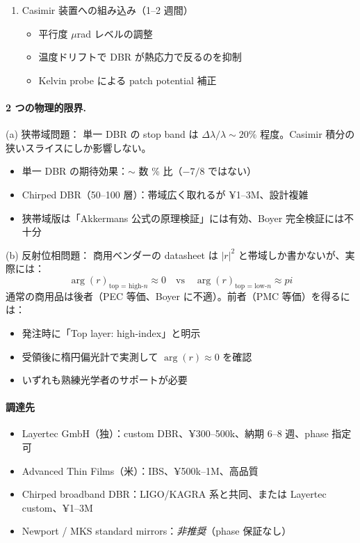\documentclass[11pt,a4paper]{article}
\def\pi{pi}%
\def\textbf#1{#1}%
\begin{document}
\begin{enumerate}
\item \textbf{Casimir 装置への組み込み（1--2 週間）}
  \begin{itemize}
  \item 平行度 $\mu$rad レベルの調整
  \item 温度ドリフトで DBR が熱応力で反るのを抑制
  \item Kelvin probe による patch potential 補正
  \end{itemize}
\end{enumerate}

\paragraph{2 つの物理的限界.}

\textbf{(a) 狭帯域問題}：
単一 DBR の stop band は $\Delta\lambda/\lambda \sim 20\%$ 程度。Casimir 積分の
狭いスライスにしか影響しない。
\begin{itemize}
\item 単一 DBR の期待効果：$\sim$ 数 \% 比（$-7/8$ ではない）
\item Chirped DBR（50--100 層）：帯域広く取れるが ¥1--3M、設計複雑
\item 狭帯域版は「Akkermans 公式の原理検証」には有効、Boyer 完全検証には不十分
\end{itemize}

\textbf{(b) 反射位相問題}：
商用ベンダーの datasheet は $|r|^2$ と帯域しか書かないが、実際には：
\[
  \arg(r)_{\text{top = high-}n} \approx 0 \quad \text{vs} \quad
  \arg(r)_{\text{top = low-}n} \approx \pi
\]
\textbf{通常の商用品は後者（PEC 等価、Boyer に不適）}。前者（PMC 等価）を得るには：
\begin{itemize}
\item 発注時に「Top layer: high-index」と明示
\item 受領後に楕円偏光計で実測して $\arg(r) \approx 0$ を確認
\item いずれも熟練光学者のサポートが必要
\end{itemize}

\paragraph{調達先}
\begin{itemize}
\item \textbf{Layertec GmbH}（独）：custom DBR、¥300--500k、納期 6--8 週、phase 指定可
\item \textbf{Advanced Thin Films}（米）：IBS、¥500k--1M、高品質
\item \textbf{Chirped broadband DBR}：LIGO/KAGRA 系と共同、または Layertec custom、¥1--3M
\item \textbf{Newport / MKS standard mirrors}：\emph{非推奨}（phase 保証なし）
\end{itemize}
\end{document}
